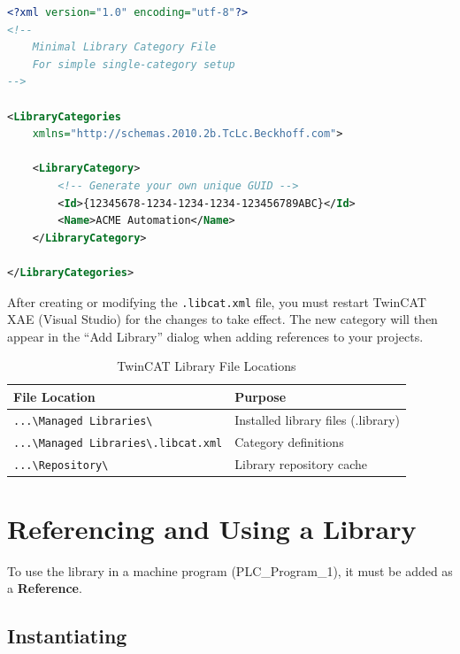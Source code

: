 \documentclass[11pt,a4paper]{article}
\begin{document}
\begin{lstlisting}[style=xmlstyle, language=XML]
<?xml version="1.0" encoding="utf-8"?>
<!--
    Minimal Library Category File
    For simple single-category setup
-->

<LibraryCategories 
    xmlns="http://schemas.2010.2b.TcLc.Beckhoff.com">
    
    <LibraryCategory>
        <!-- Generate your own unique GUID -->
        <Id>{12345678-1234-1234-1234-123456789ABC}</Id>
        <Name>ACME Automation</Name>
    </LibraryCategory>
    
</LibraryCategories>
\end{lstlisting}

\begin{notebox}
After creating or modifying the \texttt{.libcat.xml} file, you must restart TwinCAT XAE (Visual Studio) for the changes to take effect. The new category will then appear in the ``Add Library'' dialog when adding references to your projects.
\end{notebox}

\begin{table}[h]
\centering
\begin{tabular}{@{}ll@{}}
\toprule
\textbf{File Location} & \textbf{Purpose} \\
\midrule
\texttt{...\textbackslash Managed Libraries\textbackslash} & Installed library files (.library) \\
\texttt{...\textbackslash Managed Libraries\textbackslash *.libcat.xml} & Category definitions \\
\texttt{...\textbackslash Repository\textbackslash} & Library repository cache \\
\bottomrule
\end{tabular}
\caption{TwinCAT Library File Locations}
\end{table}

\section{Referencing and Using a Library}

To use the library in a machine program (PLC\_Program\_1), it must be added as a \textbf{Reference}.

\subsection{Instantiating}
\end{document}
